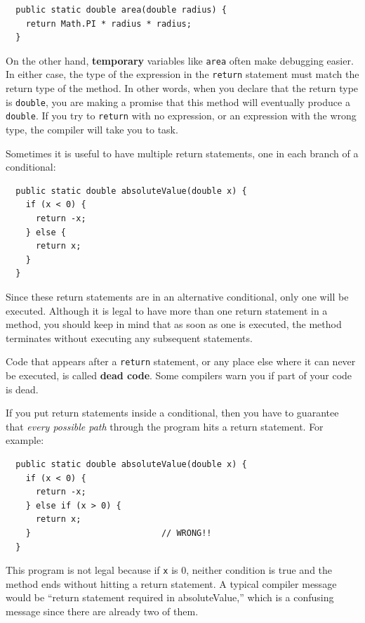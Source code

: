 \begin{lstlisting}
  public static double area(double radius) {
    return Math.PI * radius * radius;
  }
\end{lstlisting}
%
On the other hand, {\bf temporary} variables like {\tt area} often
make debugging easier.  In either case, the type of the expression in
the {\tt return} statement must match the return type of the method.
In other words, when you declare that the return type is {\tt double},
you are making a promise that this method will eventually
produce a {\tt double}.  If you try to {\tt return} with no
expression, or an expression with the wrong type, the compiler will
take you to task.


Sometimes it is useful to have multiple return
statements, one in each branch of a conditional:

\begin{lstlisting}
  public static double absoluteValue(double x) {
    if (x < 0) {
      return -x;
    } else {
      return x;
    }
  }
\end{lstlisting}
%
Since these return statements are in an alternative conditional,
only one will be executed.  Although it is legal to have more than one
return statement in a method, you should keep in mind
that as soon as one is executed, the method
terminates without executing any subsequent statements.

Code that appears after a {\tt return} statement, or any place else
where it can never be executed, is called {\bf dead code}.  Some
compilers warn you if part of your code is dead.


If you put return statements inside a conditional, then
you have to guarantee that {\em every possible path} through
the program hits a return statement.  For example:

\begin{lstlisting}
  public static double absoluteValue(double x) {
    if (x < 0) {
      return -x;
    } else if (x > 0) {
      return x;
    }                          // WRONG!!
  }
\end{lstlisting}
%
This program is not legal because if {\tt x} is 0,
neither condition is true and the method ends without hitting
a return statement.  A typical compiler message would be ``return
statement required in absoluteValue,'' which is a confusing message
since there are already two of them.


